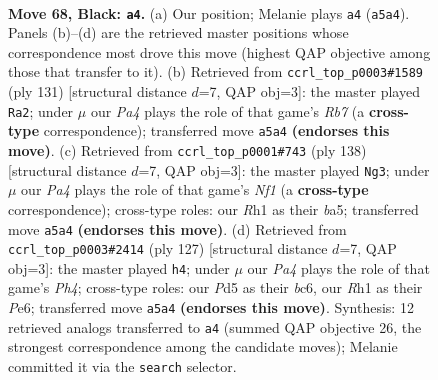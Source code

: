 \documentclass[11pt]{article}
\begin{document}
\clearpage

\begin{figure}[p]\centering
\begin{subfigure}{0.46\textwidth}\centering
\resizebox{\linewidth}{!}{%
\newchessgame
\chessboard[
  setfen={8/3k4/2p5/p2p4/8/8/4K3/7r b - - 7 68},
  showmover=false,
  pgfstyle=straightmove, color=movearrow, markmove={a5-a4}
]}
\caption{}
\end{subfigure}\hfill
\begin{subfigure}{0.46\textwidth}\centering
\resizebox{\linewidth}{!}{%
\newchessgame
\chessboard[
  setfen={3R4/6pk/P4p2/2K4p/8/8/1r6/8 b - - 1 66},
  showmover=false,
  pgfstyle=straightmove, color=movearrow, markmove={b2-a2}
]}
\caption{}
\end{subfigure}
\\[4pt]
\begin{subfigure}{0.46\textwidth}\centering
\resizebox{\linewidth}{!}{%
\newchessgame
\chessboard[
  setfen={8/8/5k2/b6P/6P1/5K2/8/5N2 w - - 11 70},
  showmover=false,
  pgfstyle=straightmove, color=movearrow, markmove={f1-g3}
]}
\caption{}
\end{subfigure}\hfill
\begin{subfigure}{0.46\textwidth}\centering
\resizebox{\linewidth}{!}{%
\newchessgame
\chessboard[
  setfen={8/8/2B1p3/7p/2K2kp1/P7/8/8 b - - 1 64},
  showmover=false,
  pgfstyle=straightmove, color=movearrow, markmove={h5-h4}
]}
\caption{}
\end{subfigure}
\caption{\textbf{Move 68, Black: \texttt{a4}.} (a) Our position; Melanie plays \texttt{a4} (\texttt{a5a4}). Panels (b)--(d) are the retrieved master positions whose correspondence most drove this move (highest QAP objective among those that transfer to it). (b) Retrieved from \texttt{ccrl\_top\_p0003\#1589} (ply 131) [structural distance $d$=7, QAP obj=3]: the master played \texttt{Ra2}; under $\mu$ our \emph{Pa4} plays the role of that game's \emph{Rb7} (a \textbf{cross-type} correspondence); transferred move \texttt{a5a4} \textbf{(endorses this move)}. (c) Retrieved from \texttt{ccrl\_top\_p0001\#743} (ply 138) [structural distance $d$=7, QAP obj=3]: the master played \texttt{Ng3}; under $\mu$ our \emph{Pa4} plays the role of that game's \emph{Nf1} (a \textbf{cross-type} correspondence); cross-type roles: our \emph{R}h1 as their \emph{b}a5; transferred move \texttt{a5a4} \textbf{(endorses this move)}. (d) Retrieved from \texttt{ccrl\_top\_p0003\#2414} (ply 127) [structural distance $d$=7, QAP obj=3]: the master played \texttt{h4}; under $\mu$ our \emph{Pa4} plays the role of that game's \emph{Ph4}; cross-type roles: our \emph{P}d5 as their \emph{b}c6, our \emph{R}h1 as their \emph{P}e6; transferred move \texttt{a5a4} \textbf{(endorses this move)}. Synthesis: 12 retrieved analogs transferred to \texttt{a4} (summed QAP objective 26, the strongest correspondence among the candidate moves); Melanie committed it via the \texttt{search} selector.}
\label{fig:thought-m135}
\end{figure}
\end{document}
